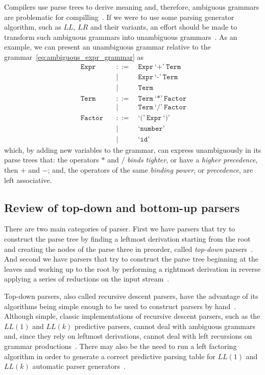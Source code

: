 \documentclass[
  oneside,
  english,
  coorientadorbanca,
  embeddedlogo,
  noabntexcite
]{ufsc-thesis-rn46-2019}
\def\ppp{::=}
\newcommand{\code}[1]{\texttt{#1}}
\newcommand{\bnfvar}[1]{\ \bnfvars{#1}}
\newcommand{\bnfvars}[1]{\code{#1}}
\newcommand{\bnfter}[1]{\ \bnfters{#1}}
\newcommand{\bnfters}[1]{\textrm{`}\code{#1}\textrm{'}}
\newcommand{\bnfprod}[2]{\bnfvars{#1} &\ &\ppp& #2}
\newcommand{\bnfmore}[1]{ && \mid{} & #1}
\begin{document}
Compilers use parse trees to derive meaning and, therefore, ambiguous grammars are problematic for compilling~\cite{appel2003modern}.
If we were to use some parsing generator algorithm, such as $LL$, $LR$ and their variants, an effort should be made to transform such ambiguous grammars into unambiguous grammars~\cite{appel2003modern}.
As an example, we can present an unambiguous grammar relative to the grammar~\eqref{eq:ambiguous_expr_grammar} as
\begin{equation}~\label{eq:unambiguous_expr_grammar}
  \begin{alignedat}{2}
    \bnfprod{Expr}{\bnfvar{Expr} \bnfter{+} \bnfvar{Term}} \\
    \bnfmore{\bnfvar{Expr}\bnfter{-}\bnfvar{Term}} \\
    \bnfmore{\bnfvar{Term}} \\
    \bnfprod{Term}{\bnfvar{Term} \bnfter{*} \bnfvar{Factor}} \\
    \bnfmore{\bnfvar{Term}\bnfter{/}\bnfvar{Factor}} \\
    \bnfprod{Factor}{\bnfter{(}\bnfvar{Expr}\bnfter{)}} \\
    \bnfmore{\bnfter{number}} \\
    \bnfmore{\bnfter{id}}
  \end{alignedat}
\end{equation}
which, by adding new variables to the grammar, can express unambiguously in its parse trees that: the operators $*$ and $/$ \textit{binds tighter}, or have a \textit{higher precedence}, then $+$ and $-$; and, the operators of the same \textit{binding power}, or \textit{precedence}, are left associative.

\subsection{Review of top-down and bottom-up parsers}
There are two main categories of parser.
First we have parsers that try to construct the parse tree by finding a leftmost derivation starting from the root and creating the nodes of the parse three in preorder, called \textit{top-down} parsers~\cite{Aho:2006:CPT:1177220}.
And second we have parsers that try to construct the parse tree beginning at the leaves and working up to the root by performing a rightmost derivation in reverse applying a series of reductions on the input stream~\cite{Aho:2006:CPT:1177220}.

Top-down parsers, also called recursive descent parsers, have the advantage of its algorithms being simple enough to be used to construct parsers by hand~\cite{appel2003modern}.
Although simple, classic implementations of recursive descent parsers, such as the $LL(1)$ and $LL(k)$ predictive parsers, cannot deal with ambiguous grammars and, since they rely on leftmost derivations, cannot deal with left recursions on grammar productions~\cite{Aho:2006:CPT:1177220}.
There may also be the need to run a left factoring algorithm in order to generate a correct predictive parsing table for $LL(1)$ and $LL(k)$ automatic parser generators~\cite{Aho:2006:CPT:1177220}.
\end{document}
